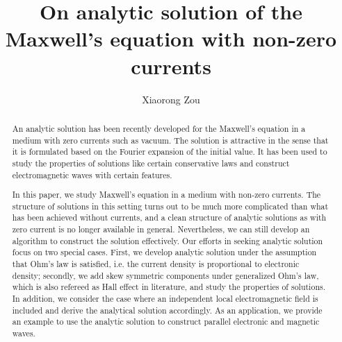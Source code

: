 \documentclass[10pt,reqno]{amsart}
\title[Closed form solution of Maxwell's equations]{On analytic solution of the Maxwell's equation with non-zero currents}
\author[X.R. Zou]{Xiaorong Zou}\address{\hspace*{-12pt}X.R.~Zou: Global Market Risk Analytic, Bank of America, NYC, NY, USA}
\renewcommand{\(}{\left(}
\renewcommand{\)}{\right)}
\numberwithin{equation}{section}
\begin{document}
\maketitle
%
\dedicatory{}
\begin{abstract}
An analytic solution has been recently developed for the Maxwell's equation in a medium with zero currents such as vacuum.  The solution is attractive in the sense that it is formulated based on the Fourier expansion of the initial value.  It has been used to study the properties of solutions like certain conservative laws and construct electromagnetic waves with certain features. 

In this paper,  we study Maxwell's equation in a medium with non-zero currents.  The structure of solutions in this setting turns out to be much more complicated than what has been achieved without currents, and a clean structure of analytic solutions as with zero current is no longer available in general. Nevertheless, we can still develop an algorithm to construct the solution effectively.  Our efforts in seeking analytic solution focus on two special cases.  First, we develop analytic solution under the assumption that Ohm's law is satisfied, i.e. the current density is proportional to electronic density;  secondly, we add skew symmetric components under generalized Ohm's law, which is also refereed as Hall effect in literature,  and study the properties of solutions. In addition, we consider the case where an independent local electromagnetic field is included and derive the analytical solution accordingly. As an application, we provide an example to use the analytic solution to construct parallel electronic and magnetic waves. 
\end{abstract}
\end{document}
